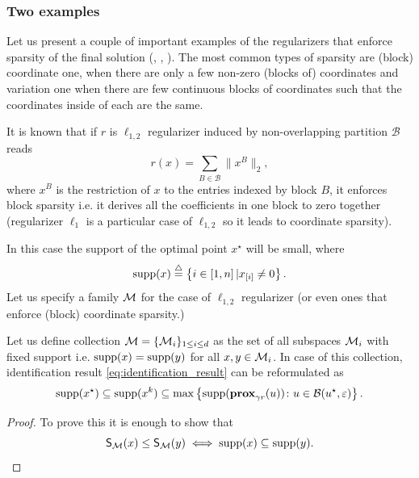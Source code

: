 \subsubsection{Two examples}
Let us present a couple of important examples of the regularizers that enforce sparsity of the final solution (\cite{argyriou2013sparsity}, \cite{jenatton2011structured}, \cite{zhao2006grouped}). The most common types of sparsity are (block) coordinate one, when there are only a few non-zero (blocks of) coordinates and variation one when there are few continuous blocks of coordinates such that the coordinates inside of each are the same.

\begin{example}\label{ex:intro_coordinate_strata}
    It is known that if $r$ is $\ell_{1,2}$ regularizer induced by non-overlapping partition $\mathcal{B}$ reads
    \begin{equation}\label{eq:l12}
         r(x) = \sum\limits_{B\in\mathcal{B}}\|x^B\|_2, 
    \end{equation}
    where $x^B$ is the restriction of $x$ to the entries indexed by block $B$, it enforces block sparsity i.e. it derives all the coefficients in one block to zero together (regularizer $\ell_1$ is a particular case of $\ell_{1,2}$ so it leads to coordinate sparsity).
    
    In this case the support of the optimal point $x^\star$ will be small, where 
    \begin{equation}\label{eq:supp}
        \mathrm{supp}(x) \stackrel{\triangle}{=}\left\{i\in [1,n]\,| x_{[i]} \neq 0 \right\}.
    \end{equation}
    Let us specify a family $\mathcal{M}$ for the case of $\ell_{1,2}$ regularizer (or even ones that enforce (block) coordinate sparsity.)
    
    Let us define collection $\mathcal{M} = \{\mathcal{M}_i\}_{1\leq i\leq d}$ as the set of all subspaces $\mathcal{M}_i$ with fixed support i.e. $\mathrm{supp}(x) = \mathrm{supp}(y)$ for all $x,y\in \mathcal{M}_i$. In case of this collection, identification result \eqref{eq:identification_result} can be reformulated as
    \begin{equation}\label{eq:ident_l1}
        \mathrm{supp}(x^\star) \subseteq \mathrm{supp}(x^k) \subseteq \max\left\{ \mathrm{supp}(\mathbf{prox}_{\gamma r}(u))\colon{u\in\mathcal{B}(u^\star,\varepsilon)}\right\}.
    \end{equation}
    
    \begin{proof}To prove this it is enough to show that
    \begin{equation}\label{eq:s_to_supp}
        \mathsf{S}_{\mathcal{M}}(x)\leq\mathsf{S}_{\mathcal{M}}(y) \iff \mathrm{supp}(x)\subseteq\mathrm{supp}(y).
    \end{equation}
    

\end{proof}
\end{example}
